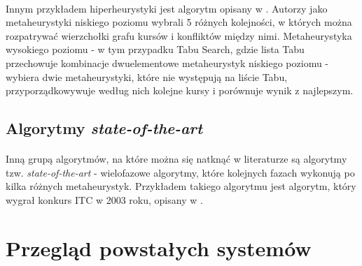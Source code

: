 \paragraph{}Innym przykładem hiperheurystyki jest algorytm opisany w \cite{gbhh}. Autorzy jako metaheurystyki niskiego poziomu wybrali 5 różnych kolejności, w których można rozpatrywać wierzchołki grafu kursów i konfliktów między nimi. Metaheurystyka wysokiego poziomu - w tym przypadku Tabu Search, gdzie lista Tabu przechowuje kombinacje dwuelementowe metaheurystyk niskiego poziomu - wybiera dwie metaheurystyki, które nie występują na liście Tabu, przyporządkowywuje według nich kolejne kursy i porównuje wynik z najlepszym.

\subsection{Algorytmy \textit{state-of-the-art}}

\paragraph{} Inną grupą algorytmów, na które można się natknąć w literaturze są algorytmy tzw. \textit{state-of-the-art} - wielofazowe algorytmy, które kolejnych fazach wykonują po kilka różnych metaheurystyk. Przykładem takiego algorytmu jest algorytm, który wygrał konkurs ITC w 2003 roku, opisany w \cite{kostuch}.


\section{Przegląd powstałych systemów}



